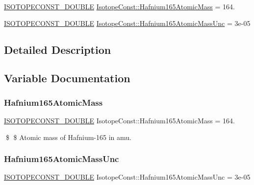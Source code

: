 \begin{DoxyCompactItemize}
\item 
\mbox{\hyperlink{group___isotope_const-_macros_ga8f45a7272ce02c0b4c65c44636ed719a}{I\+S\+O\+T\+O\+P\+E\+C\+O\+N\+S\+T\+\_\+\+D\+O\+U\+B\+LE}} \mbox{\hyperlink{group___isotope_const-_hafnium-_hf165_ga5db40bbe843b2c55f4f3759776fb0e19}{Isotope\+Const\+::\+Hafnium165\+Atomic\+Mass}} = 164.
\item 
\mbox{\hyperlink{group___isotope_const-_macros_ga8f45a7272ce02c0b4c65c44636ed719a}{I\+S\+O\+T\+O\+P\+E\+C\+O\+N\+S\+T\+\_\+\+D\+O\+U\+B\+LE}} \mbox{\hyperlink{group___isotope_const-_hafnium-_hf165_ga3a9e18b30ac881cc5b46e7ddf27eaa59}{Isotope\+Const\+::\+Hafnium165\+Atomic\+Mass\+Unc}} = 3e-\/05
\end{DoxyCompactItemize}


\subsection{Detailed Description}


\subsection{Variable Documentation}
\mbox{\label{group___isotope_const-_hafnium-_hf165_ga5db40bbe843b2c55f4f3759776fb0e19}} 
\subsubsection{\texorpdfstring{Hafnium165\+Atomic\+Mass}{Hafnium165AtomicMass}}
{\footnotesize\ttfamily \mbox{\hyperlink{group___isotope_const-_macros_ga8f45a7272ce02c0b4c65c44636ed719a}{I\+S\+O\+T\+O\+P\+E\+C\+O\+N\+S\+T\+\_\+\+D\+O\+U\+B\+LE}} Isotope\+Const\+::\+Hafnium165\+Atomic\+Mass = 164.}

\$ \$ Atomic mass of Hafnium-\/165 in amu. \mbox{\label{group___isotope_const-_hafnium-_hf165_ga3a9e18b30ac881cc5b46e7ddf27eaa59}} 
\subsubsection{\texorpdfstring{Hafnium165\+Atomic\+Mass\+Unc}{Hafnium165AtomicMassUnc}}
{\footnotesize\ttfamily \mbox{\hyperlink{group___isotope_const-_macros_ga8f45a7272ce02c0b4c65c44636ed719a}{I\+S\+O\+T\+O\+P\+E\+C\+O\+N\+S\+T\+\_\+\+D\+O\+U\+B\+LE}} Isotope\+Const\+::\+Hafnium165\+Atomic\+Mass\+Unc = 3e-\/05}

